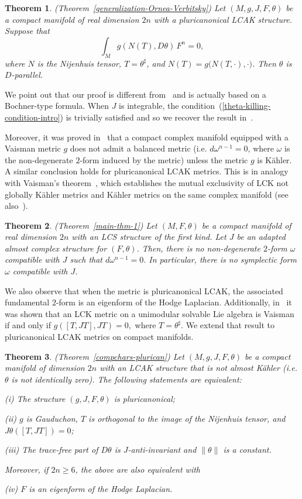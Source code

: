 \documentclass[a4paper,11pt]{amsart}
\newtheorem*{thm*}{Theorem}
\theoremstyle{definition}
\renewcommand{\[}{\begin{equation*}}
\renewcommand{\]}{\end{equation*}}
\begin{document}
\begin{thm*}(Theorem~\ref{generalization-Ornea-Verbitsky})
Let $(M, g, J, F, \theta)$ be a compact manifold of real dimension $2n$ with a pluricanonical LCAK structure. Suppose that 
\begin{equation}\label{theta-killing-condition-intro}
\int_Mg(N(T),D\theta)\,F^n=0,
\end{equation}
where $N$ is the Nijenhuis tensor, $T=\theta^\sharp$, and $N(T)=g\big(N(T,\cdot),\cdot \big)$. Then $\theta$ is $D$-parallel.
\end{thm*}
We point out that our proof is different from~\cite{MR4771164,MR3674175} and is actually based on a Bochner-type formula. When $J$ is integrable, the condition~(\ref{theta-killing-condition-intro}) is trivially satisfied and so we recover the result in~\cite{MR4771164,MR3674175}.

Moreover, it was proved in~\cite{angella2023notecompatibilityspecialhermitian} that a compact complex manifold equipped with a Vaisman metric $g$ does not admit a balanced metric (i.e. $d\omega^{n-1}=0$, where $\omega$ is the non-degenerate $2$-form induced by the metric) unless the metric $g$ is K\"ahler. A similar conclusion holds for pluricanonical LCAK metrics. This is in analogy with Vaisman’s theorem~\cite{Vais}, which establishes the mutual exclusivity of LCK not globally K\"ahler metrics and Kähler metrics on the same complex manifold (see also~\cite{MR4824944}).

\begin{thm*} (Theorem~\ref{main-thm-1})
 Let $(M,F,\theta)$ be a compact manifold of real dimension $2n$ with an LCS structure of the first kind. Let $J$ be an adapted almost complex structure for $(F, \theta)$. Then, there is no non-degenerate $2$-form $\omega$ compatible with $J$ such that $d\omega^{n-1}=0.$ In particular, there is no symplectic form $\omega$ compatible with $J$. 
 \end{thm*}
We also observe that when the metric is pluricanonical LCAK, the associated fundamental $2$-form is an eigenform of the Hodge Laplacian. Additionally, in~\cite{MR3397500} it was shown that an LCK metric on a unimodular solvable Lie algebra is Vaisman if and only if $g([T,JT],JT)=0,$ where $T=\theta^\sharp.$ We extend that result to pluricanonical LCAK metrics on compact manifolds.

\begin{thm*} (Theorem~\ref{compchars-plurican})
 Let $(M, g, J, F, \theta)$ be a compact manifold of dimension $2n$ with an LCAK structure that is not almost K\"ahler (i.e. $\theta$ is not identically zero). The following statements are equivalent:

 (i) The structure $(g, J, F, \theta)$ is pluricanonical; 

 (ii) $g$ is Gauduchon, $T$ is orthogonal to the image of the Nijenhuis tensor, and $J\theta([T,JT]) = 0$;

 (iii) The trace-free part of $D \theta$ is $J$-anti-invariant and 
 $\| \theta \|$ is a constant.

\noindent Moreover, if $2n \geq 6$, the above are also equivalent with

(iv) $F$ is an eigenform of the Hodge Laplacian.
\end{thm*}
\end{document}
